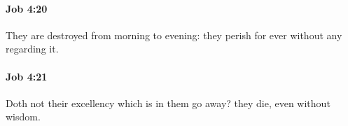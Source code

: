 		\paragraph{Job 4:20} %
			\label{JOB-4-20}

			They are destroyed from morning to evening: they perish for ever without any regarding it.


		\paragraph{Job 4:21} %
			\label{JOB-4-21}

			Doth not their excellency which is in them go away? they die, even without wisdom.

